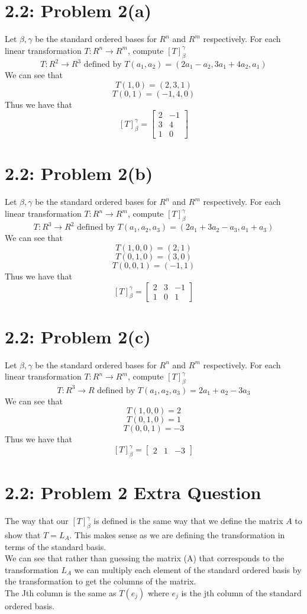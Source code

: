 \documentclass[answers,12pt,addpoints]{exam}
\begin{document}
\section*{2.2: Problem 2(a)}
Let $\beta, \gamma$ be the standard ordered bases for $R^n$ and $R^m$ respectively. For each linear transformation $T: R^n \to R^m$, compute $[T]_{\beta}^{\gamma}$\\
$$ T: R^2 \to R^3 \text{ defined by } T(a_1, a_2) = (2a_1 - a_2, 3a_1 + 4a_2, a_1) $$
We can see that
$$ T(1,0) = (2,3,1) $$
$$ T(0,1) = (-1,4,0) $$
Thus we have that
$$ [T]_{\beta}^{\gamma} = \begin{bmatrix}
2 & -1 \\ 3 & 4 \\ 1 & 0
\end{bmatrix} $$

\section*{2.2: Problem 2(b)}
Let $\beta, \gamma$ be the standard ordered bases for $R^n$ and $R^m$ respectively. For each linear transformation $T: R^n \to R^m$, compute $[T]_{\beta}^{\gamma}$\\
$$ T: R^3 \to R^2 \text{ defined by } T(a_1, a_2, a_3) = (2a_1 + 3a_2 -a_3, a_1 + a_3) $$
We can see that
$$ T(1,0,0) = (2,1) $$
$$ T(0,1,0) = (3,0) $$
$$ T(0,0,1) = (-1,1) $$
Thus we have that
$$ [T]_{\beta}^{\gamma} = \begin{bmatrix}
2 & 3 & -1 \\ 1 & 0 & 1
\end{bmatrix} $$

\section*{2.2: Problem 2(c)}
Let $\beta, \gamma$ be the standard ordered bases for $R^n$ and $R^m$ respectively. For each linear transformation $T: R^n \to R^m$, compute $[T]_{\beta}^{\gamma}$\\
$$ T: R^3 \to R \text{ defined by } T(a_1,a_2,a_3) = 2a_1 +a_2 -3a_3 $$
We can see that
$$ T(1,0,0) = 2 $$
$$ T(0,1,0) = 1 $$
$$ T(0,0,1) = -3 $$
Thus we have that
$$ [T]_{\beta}^{\gamma} = \begin{bmatrix}
2 & 1 & -3
\end{bmatrix} $$
\section*{2.2: Problem 2 Extra Question}
The way that our $[T]_{\beta}^{\gamma}$ is defined is the same way that we define the matrix $A$ to show that $T = L_A$. This makes sense as we are defining the transformation in terms of the standard basis.\\
We can see that rather than guessing the matrix (A) that corresponds to the transformation $L_A$ we can multiply each element of the standard ordered basis by the transformation to get the columns of the matrix.\\
The Jth column is the same as $T(e_j)$ where $e_j$ is the jth column of the standard ordered basis.\\
\end{document}
